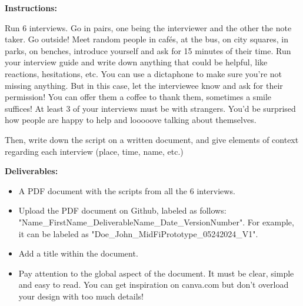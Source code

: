 \makeheaderfiles

\textbf{Instructions:}

Run 6 interviews. Go in pairs, one being the interviewer and the other the note taker.
Go outside! Meet random people in cafés, at the bus, on city squares, in parks, on benches, introduce yourself and ask for 15 minutes of their time. Run your interview guide and write down anything that could be helpful, like reactions, hesitations, etc. You can use a dictaphone to make sure you're not missing anything. But in this case, let the interviewee know and ask for their permission!
You can offer them a coffee to thank them, sometimes a smile suffices!
At least 3 of your interviews must be with strangers. You'd be surprised how people are happy to help and looooove talking about themselves.

Then, write down the script on a written document, and give elements of context regarding each interview (place, time, name, etc.)

\textbf{Deliverables:}

\begin{itemize}
\item A PDF document with the scripts from all the 6 interviews.
\item Upload the PDF document on Github, labeled as follows: "Name\_FirstName\_DeliverableName\_Date\_VersionNumber". For example, it can be labeled as "Doe\_John\_MidFiPrototype\_05242024\_V1".
\item Add a title within the document.
\item Pay attention to the global aspect of the document. It must be clear, simple and easy to read. You can get inspiration on canva.com but don't overload your design with too much details!
\end{itemize}

